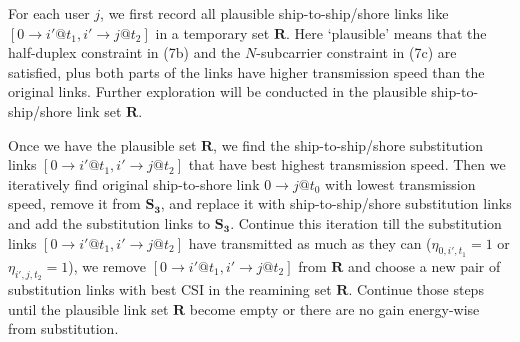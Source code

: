 \documentclass[conference]{IEEEtran}
\begin{document}
For each user $j$, we first record all plausible ship-to-ship/shore links like $\left[ {0 \to i'@{t_1},i' \to j@{t_2}} \right]$ in a temporary set $\mathbf{R}$. Here `plausible' means that the half-duplex constraint in (7b) and the $N$-subcarrier constraint in (7c) are satisfied, plus both parts of the links have higher transmission speed than the original links. Further exploration will be conducted in the plausible ship-to-ship/shore link set $\mathbf{R}$. 



Once we have the plausible set $\mathbf{R}$, we find the ship-to-ship/shore substitution links $\left[ {0 \to i'@{t_1},i' \to j@{t_2}} \right]$ that have best highest transmission speed. Then we iteratively find original ship-to-shore link $0 \to j@{t_0}$ with lowest transmission speed, remove it from ${{\mathbf{S}}_{\mathbf{3}}}$, and replace it with ship-to-ship/shore substitution links and add the substitution links to ${{\mathbf{S}}_{\mathbf{3}}}$. 
Continue this iteration till the substitution links $\left[ {0 \to i'@{t_1},i' \to j@{t_2}} \right]$ have transmitted as much as they can (${\eta _{0,i',{t_1}}=1}$ or ${\eta _{i',j,{t_2}}=1}$), we remove $\left[ {0 \to i'@{t_1},i' \to j@{t_2}} \right]$ from $\mathbf{R}$ and choose a new pair of substitution links with best CSI in the reamining set $\mathbf{R}$. 
Continue those steps until the plausible link set $\mathbf{R}$ become empty or there are no gain energy-wise from substitution. 

\end{document}
